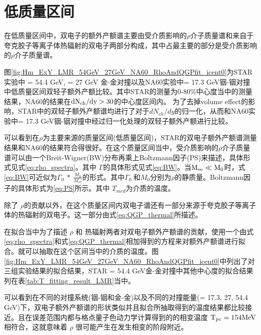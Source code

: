\section{低质量区间}

在低质量区间中，双电子的额外产额谱主要由受介质影响的$\rho$介子质量谱和来自于夸克胶子等离子体热辐射的双电子两部分构成，其中占最主要的部分是受介质影响的$\rho$介子质量谱。

图\ref{fig:Hm_ExY_LMR_54GeV_27GeV_NA60_RhoAndQGPfit_icent0}为STAR实验中 \sNN = 54.4 GeV, \sNN = 27 GeV 金-金对撞以及NA60实验中\sNN = 17.3 GeV铟-铟对撞中低质量区间双轻子额外产额比较\cite{Specht:2010xu}。其中STAR的测量为0-80\%中心度当中的测量结果，NA60的结果在$\rm{dN_{ch}/dy > 30}$的中心度区间内。
为了去掉volume effect的影响，STAR中的双轻子额外产额谱均进行了对于$dN_{ch}/dy$的归一化，从而和NA60实验中\sNN = 17.3 GeV铟-铟对撞中经过归一化处理的双轻子额外产额进行比较。

可以看到在$\rho$为主要来源的质量区间(低质量区间)，STAR的双电子额外产额谱测量结果和NA60的结果符合得很好。在这个质量区间当中，受介质影响的$\rho$介子质量谱可以由一个Breit-Wigner(BW)分布再乘上Boltzmann因子(PS)来描述，具体形式见式\ref{eq:rho_spectra}\cite{STAR:2002caw,Shuryak:2002kd,Kolb:2003bk,Rapp:2003ar}。其中 $\Gamma$的具体形式见式\ref{eq:BW}。当$\rm{M_{ee} \ll M_0}$时，式\ref{eq:BW}可近似为$\Gamma_0~*~\frac{M_0}{M_{ee}}$的形式。其中$\Gamma_0~$和$M_0$分别为$\rho$的静质量。Boltzmann因子的具体形式为\ref{eq:PS}所示。其中 $T_{med}$为介质的温度。

除了 $\rho$的贡献以外，在这个质量区间内双电子谱还有一部分来源于夸克胶子等离子体的热辐射的双电子。这一部分由式\ref{eq:QGP_thermal}\cite{Rapp:2014hha}所描述。

在拟合当中为了描述 $\rho$ 和 热辐射两者对双电子额外产额谱的贡献，使用一个由式\ref{eq:rho_spectra}和式\ref{eq:QGP_thermal}相加得到的方程来对额外产额谱进行拟合。就可以抽取在这个区间当中的介质的温度。图\ref{fig:Hm_ExY_LMR_54GeV_27GeV_NA60_RhoAndQGPfit_icent0}中列出了对三组实验结果的拟合结果，STAR \sNN = 54.4 GeV金-金对撞中其他中心度的拟合结果列在表\ref{tab:T_fitting_result_LMR}当中。

可以看到在不同的对撞系统(铟-铟和金-金)以及不同的对撞能量(\sNN = 17.3, 27, 54.4 GeV)下，双电子额外产额谱的形状类似并且拟合所抽取得到的温度结果都比较接近。且在误差范围内都与格点量子色动力学计算得到的的相变温度 $\rm{T_{pc} = 154 MeV}$\cite{HotQCD:2018pds}相符合，这就意味着 $\rho$ 很可能产生在发生相变的阶段附近。

